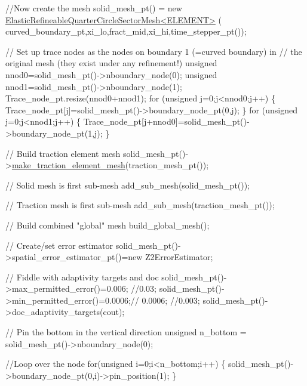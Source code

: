 \begin{DoxyCodeInclude}
 \textcolor{comment}{//Now create the mesh}
 solid\_mesh\_pt() = \textcolor{keyword}{new} \hyperlink{classElasticRefineableQuarterCircleSectorMesh}{ElasticRefineableQuarterCircleSectorMesh<ELEMENT>}
      (
  curved\_boundary\_pt,xi\_lo,fract\_mid,xi\_hi,time\_stepper\_pt());

 \textcolor{comment}{// Set up trace nodes as the nodes on boundary 1 (=curved boundary) in }
 \textcolor{comment}{// the original mesh (they exist under any refinement!) }
 \textcolor{keywordtype}{unsigned} nnod0=solid\_mesh\_pt()->nboundary\_node(0);
 \textcolor{keywordtype}{unsigned} nnod1=solid\_mesh\_pt()->nboundary\_node(1);
 Trace\_node\_pt.resize(nnod0+nnod1);
 \textcolor{keywordflow}{for} (\textcolor{keywordtype}{unsigned} j=0;j<nnod0;j++)
  \{
   Trace\_node\_pt[j]=solid\_mesh\_pt()->boundary\_node\_pt(0,j);
  \}
 \textcolor{keywordflow}{for} (\textcolor{keywordtype}{unsigned} j=0;j<nnod1;j++)
  \{
   Trace\_node\_pt[j+nnod0]=solid\_mesh\_pt()->boundary\_node\_pt(1,j);
  \}

 \textcolor{comment}{// Build traction element mesh}
 solid\_mesh\_pt()->\hyperlink{classElasticRefineableQuarterCircleSectorMesh_ad9734ea7aee2141079544bb782d3ace1}{make\_traction\_element\_mesh}(traction\_mesh\_pt());
 
 \textcolor{comment}{// Solid mesh is first sub-mesh}
 add\_sub\_mesh(solid\_mesh\_pt());

 \textcolor{comment}{// Traction mesh is first sub-mesh}
 add\_sub\_mesh(traction\_mesh\_pt());

 \textcolor{comment}{// Build combined "global" mesh}
 build\_global\_mesh();


 \textcolor{comment}{// Create/set error estimator}
 solid\_mesh\_pt()->spatial\_error\_estimator\_pt()=\textcolor{keyword}{new} Z2ErrorEstimator;
  
 \textcolor{comment}{// Fiddle with adaptivity targets and doc}
 solid\_mesh\_pt()->max\_permitted\_error()=0.006; \textcolor{comment}{//0.03;}
 solid\_mesh\_pt()->min\_permitted\_error()=0.0006;\textcolor{comment}{// 0.0006; //0.003;}
 solid\_mesh\_pt()->doc\_adaptivity\_targets(cout);

 \textcolor{comment}{// Pin the bottom in the vertical direction}
 \textcolor{keywordtype}{unsigned} n\_bottom = solid\_mesh\_pt()->nboundary\_node(0);

 \textcolor{comment}{//Loop over the node}
 \textcolor{keywordflow}{for}(\textcolor{keywordtype}{unsigned} i=0;i<n\_bottom;i++)
  \{
   solid\_mesh\_pt()->boundary\_node\_pt(0,i)->pin\_position(1);
  \}


\end{DoxyCodeInclude}
